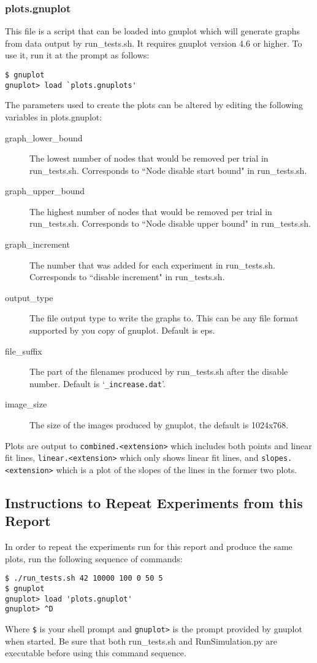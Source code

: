 \documentclass[notitlepage,12pt]{article}
\begin{document}
\subsubsection{plots.gnuplot}
\label{sec:plots}
This file is a script that can be loaded into gnuplot which will generate graphs
from data output by run\_tests.sh. It requires gnuplot version 4.6 or higher. To
use it, run it at the prompt as follows:
\begin{verbatim}
$ gnuplot
gnuplot> load `plots.gnuplots'
\end{verbatim}
The parameters used to create the plots can be altered by editing the following
variables in plots.gnuplot:
\begin{description}
  \item[graph\_lower\_bound] The lowest number of nodes that would be removed
    per trial in run\_tests.sh. Corresponds to ``Node disable start bound" in run\_tests.sh.
  \item[graph\_upper\_bound] The highest number of nodes that would be removed
    per trial in run\_tests.sh. Corresponds to ``Node disable upper bound" in run\_tests.sh.
  \item[graph\_increment] The number that was added for each experiment in
    run\_tests.sh. Corresponds to ``disable increment" in run\_tests.sh.
  \item[output\_type] The file output type to write the graphs to. This can be
    any file format supported by you copy of gnuplot. Default is eps.
  \item[file\_suffix] The part of the filenames produced by run\_tests.sh after
    the disable number. Default is `\texttt{\_increase.dat}'.
  \item[image\_size] The size of the images produced by gnuplot, the default is 1024x768.
\end{description}

Plots are output to \texttt{combined.<extension>} which includes both points and
linear fit lines, \texttt{linear.<extension>} which only shows linear fit lines,
and \texttt{slopes.<extension>}
which is a plot of the slopes of the lines in the former two plots.

\subsection{Instructions to Repeat Experiments from this Report}
\label{sec:repeatinstr}
In order to repeat the experiments run for this report and produce the same
plots, run the following sequence of commands:
\begin{verbatim}
$ ./run_tests.sh 42 10000 100 0 50 5
$ gnuplot
gnuplot> load 'plots.gnuplot'
gnuplot> ^D
\end{verbatim}
Where
\texttt{\$}
is your shell prompt and
\texttt{gnuplot>}
 is the prompt provided by gnuplot when started. Be sure that both
run\_tests.sh and RunSimulation.py are executable before using this command sequence.
\end{document}
